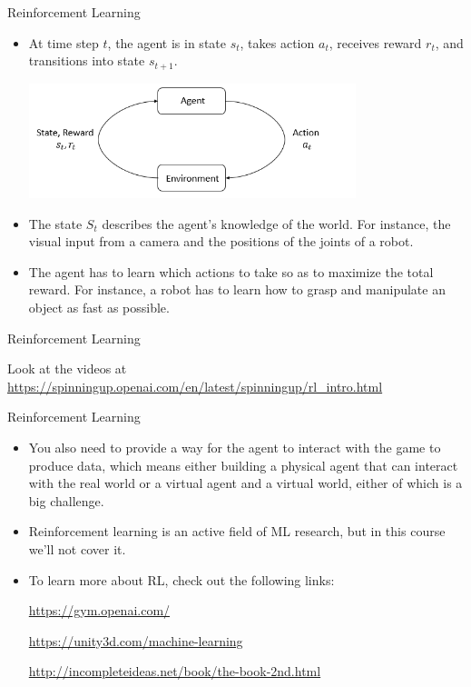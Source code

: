 \documentclass{beamer}
\begin{document}
\begin{frame}{Reinforcement Learning}

\begin{itemize}

\item At time step $t$, the agent is in state $s_t$, takes action $a_t$, receives reward $r_t$, and transitions into state $s_{t+1}$.

\includegraphics[width=0.75\textwidth]{images/rl_diagram_transparent_bg.png}

\item The state $S_t$ describes the agent's knowledge of the world. For instance, the visual input from a camera and the positions of the joints of a robot.

\item The agent has to learn which actions to take so as to maximize the total reward.  For instance, a robot has to learn how to grasp and manipulate an object as fast as possible.
\end{itemize}

\end{frame}


\begin{frame}{Reinforcement Learning}

Look at the videos at \url{https://spinningup.openai.com/en/latest/spinningup/rl\_intro.html}

\end{frame}

\begin{frame}{Reinforcement Learning}

\begin{itemize} 
\item You also need to provide a way for the agent to interact with the game to produce data, which means either building a physical agent that can interact with the real world or a virtual agent and a virtual world, either of which is a big challenge. 

\item Reinforcement learning is an active field of ML research, but in this course we'll not cover it.

\item To learn more about RL, check out the following links:

\url{https://gym.openai.com/}

\url{https://unity3d.com/machine-learning}

\url{http://incompleteideas.net/book/the-book-2nd.html}
\end{itemize}

\end{frame}
\end{document}
